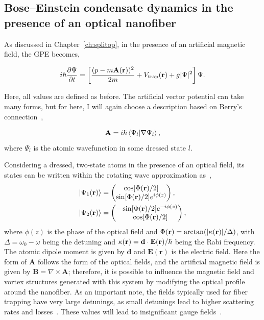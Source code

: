 \subsection{Bose--Einstein condensate dynamics in the presence of an optical nanofiber}

As discussed in Chapter~\ref{ch:splitop}, in the presence of an artificial magnetic field, the GPE becomes,

\begin{equation}
i\hbar \frac{\partial \Psi}{\partial t} = \left[\frac{(p-m\mathbf{A}({\bf r}))^2}{2m} + V_{\text{trap}}({\bf r}) + g|\Psi|^2 \right] \Psi.
\end{equation}

\noindent Here, all values are defined as before.
The artificial vector potential can take many forms, but for here, I will again choose a description based on Berry's connection~\cite{dalibard2011},

\begin{equation}
  \mathbf{A} = i\hbar \braket{\Psi_l | \nabla \Psi_l},
\end{equation}
\noindent where $\Psi_l$ is the atomic wavefunction in some dressed state $l$.

Considering a dressed, two-state atoms in the presence of an optical field, its states can be written within the rotating wave approximation as~\cite{mochol2015},
\begin{align}
\ket{\Psi_1({\bf r})} &= 
\begin{pmatrix}
    \cos[\Phi({\bf r})/2] \\
     \sin[\Phi({\bf r}) /2]e^{i\phi(z)} 
\end{pmatrix},\\
\ket{\Psi_2({\bf r})} &= 
\begin{pmatrix}
    -\sin[\Phi({\bf r}) /2]e^{-i\phi(z)} \\
    \quad\cos[\Phi({\bf r})/2]
\end{pmatrix},
\end{align}
\noindent where $\phi(z)$ is the phase of the optical field and $\Phi({\bf r}) = \arctan(|\kappa({\bf r})|/\Delta)$, with $\Delta = \omega_0 - \omega$ being the detuning and $\kappa({\bf r}) = \mathbf{d} \cdot \mathbf{E}({\bf r}) / \hbar$ being the Rabi frequency.
The atomic dipole moment is given by $\mathbf{d}$ and $\mathbf{E(\mathbf{r})}$ is the electric field.
Here the form of $\mathbf{A}$ follows the form of the optical fields, and the artificial magnetic field is given by $\mathbf{B}= \nabla \times \mathbf{A}$; therefore, it is possible to influence the magnetic field and vortex structures generated with this system by modifying the optical profile around the nanofiber.
As an important note, the fields typically used for fiber trapping have very large detunings, as small detunings lead to higher scattering rates and losses~\cite{dowling1996}.
These values will lead to insignificant gauge fields~\cite{sachdeva2017}.

